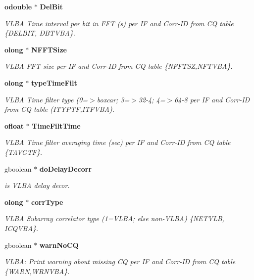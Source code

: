 \begin{CompactItemize}
{\bf odouble} $\ast$ {\bf Del\-Bit}
\begin{CompactList}\small\item\em VLBA Time interval per bit in FFT (s) per IF and Corr-ID from CQ table \{DELBIT, DBTVBA\}. \item\end{CompactList}\item 
{\bf olong} $\ast$ {\bf NFFTSize}
\begin{CompactList}\small\item\em VLBA FFT size per IF and Corr-ID from CQ table \{NFFTSZ,NFTVBA\}. \item\end{CompactList}\item 
{\bf olong} $\ast$ {\bf type\-Time\-Filt}
\begin{CompactList}\small\item\em VLBA Time filter type (0=$>$boxcar; 3=$>$32-4; 4=$>$64-8 per IF and Corr-ID from CQ table (ITYPTF,ITFVBA). \item\end{CompactList}\item 
{\bf ofloat} $\ast$ {\bf Time\-Filt\-Time}
\begin{CompactList}\small\item\em VLBA Time filter averaging time (sec) per IF and Corr-ID from CQ table \{TAVGTF\}. \item\end{CompactList}\item 
gboolean $\ast$ {\bf do\-Delay\-Decorr}
\begin{CompactList}\small\item\em is VLBA delay decor. \item\end{CompactList}\item 
{\bf olong} $\ast$ {\bf corr\-Type}
\begin{CompactList}\small\item\em VLBA Subarray correlator type (1=VLBA; else non-VLBA) \{NETVLB, ICQVBA\}. \item\end{CompactList}\item 
gboolean $\ast$ {\bf warn\-No\-CQ}
\begin{CompactList}\small\item\em VLBA: Print warning about missing CQ per IF and Corr-ID from CQ table \{WARN,WRNVBA\}. \item\end{CompactList}\end{CompactItemize}



